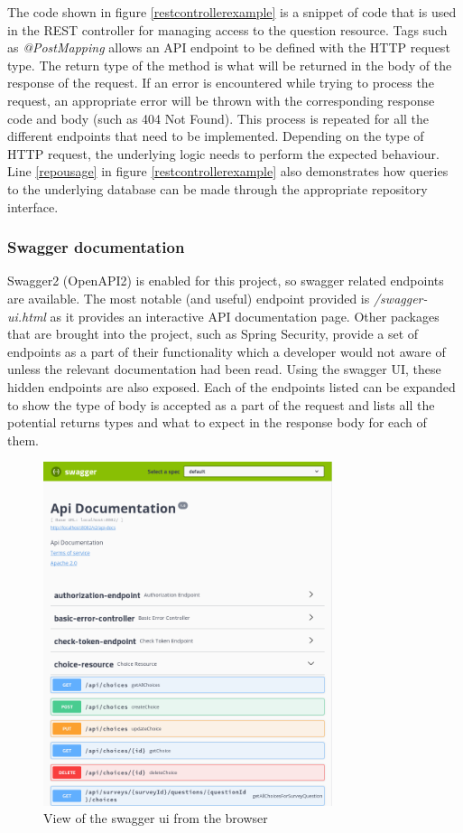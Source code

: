 The code shown in figure \ref{restcontrollerexample} is a snippet of code that is used in the REST controller for managing access to the question resource. Tags such as \textit{@PostMapping} allows an API endpoint to be defined with the HTTP request type.
The return type of the method is what will be returned in the body of the response of the request.
If an error is encountered while trying to process the request, an appropriate error will be thrown with the corresponding response code and body (such as 404 Not Found).
This process is repeated for all the different endpoints that need to be implemented.
Depending on the type of HTTP request, the underlying logic needs to perform the expected behaviour. 
Line \ref{repousage} in figure \ref{restcontrollerexample} also demonstrates how queries to the underlying database can be made through the appropriate
repository interface.

\subsubsection{Swagger documentation}
Swagger2 (OpenAPI2) is enabled for this project, so swagger related endpoints are available.
The most notable (and useful) endpoint provided is \textit{/swagger-ui.html} as it provides an interactive API documentation page.
Other packages that are brought into the project, such as Spring Security, provide a set of endpoints as a part of their functionality which
a developer would not aware of unless the relevant documentation had been read. 
Using the swagger UI, these hidden endpoints are also exposed.
Each of the endpoints listed can be expanded to show the type of body is accepted as a part of the request and lists all the potential 
returns types and what to expect in the response body for each of them.

\begin{figure}[ht]
    \centering
    \includegraphics[width=320px]{images/swagger-ui.png}
    \caption{View of the swagger ui from the browser}
    \label{swaggerui}
\end{figure}

